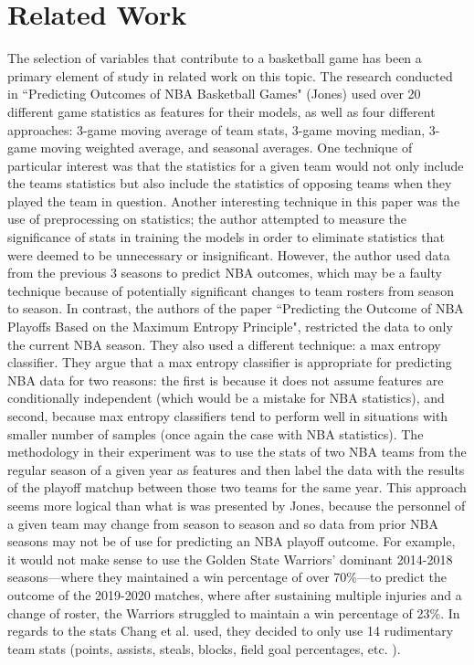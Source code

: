 \documentclass[letterpaper]{article} %
\begin{document}

\section{Related Work}

The selection of variables that contribute to a basketball game has been a primary element of study in related work on this topic. The research conducted in ``Predicting Outcomes of NBA Basketball Games" (Jones) used over 20 different game statistics as features for their models, as well as four different approaches: 3-game moving average of team stats, 3-game moving median, 3-game moving weighted average, and seasonal averages. One technique of particular interest was that the statistics for a given team would not only include the teams statistics but also include the statistics of opposing teams when they played the team in question. Another interesting technique in this paper was the use of preprocessing on statistics; the author attempted to measure the significance of stats in training the models in order to eliminate statistics that were deemed to be unnecessary or insignificant. However, the author used data from the previous 3 seasons to predict NBA outcomes, which may be a faulty technique because of potentially significant changes to team rosters from season to season. In contrast, 
the authors \cite{predicting_maximum_entropy} of the paper ``Predicting the Outcome of NBA Playoffs Based on the Maximum Entropy Principle", restricted the data to only the current NBA season. They also used a different technique: a max entropy classifier. They argue that a max entropy classifier is appropriate for predicting NBA data for two reasons: the first is because it does not assume features are conditionally independent (which would be a mistake for NBA statistics), and second, because max entropy classifiers tend to perform well in situations with smaller number of samples (once again the case with NBA statistics). The methodology in their experiment was to use the stats of two NBA teams from the regular season of a given year  as features and then label the data with the results of the playoff matchup between those two teams for the same year. This approach seems more logical than what is was presented by Jones, because the personnel of a given team may change from season to season and so data from prior NBA seasons may not be of use for predicting an NBA playoff outcome. For example, it would not make sense to use the Golden State Warriors' dominant 2014-2018 seasons---where they maintained a win percentage of over 70\%---to predict the outcome of the 2019-2020 matches, where after sustaining multiple injuries and a change of roster, the Warriors struggled to maintain a win percentage of 23\%. In regards to the stats Chang et al. used, they decided to only use 14 rudimentary team stats (points, assists, steals, blocks, field goal percentages, etc. ).
\end{document}
